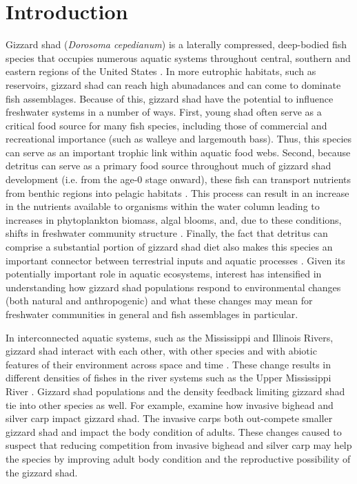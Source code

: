 \documentclass[preprint,review,12pt,authoryear]{elsarticle}
\begin{document}
\section{Introduction}
Gizzard shad (\emph{Dorosoma cepedianum}) is a laterally compressed, deep-bodied fish species that occupies numerous aquatic systems throughout central, southern and eastern regions of the United States \citep{pierce1981aspects,vanni2005linking}.  In more eutrophic habitats, such as reservoirs, gizzard shad can reach high abunadances and can come to dominate fish assemblages. Because of this, gizzard shad have the potential to influence freshwater systems in a number of ways. 
First, young shad often serve as a critical food source for many fish species, including those of commercial and recreational importance (such as walleye and largemouth bass)\citep{jester1972life}. Thus, this species can serve as an important trophic link within aquatic food webs.
Second, because detritus can serve as a primary food source throughout much of gizzard shad development (i.e. from the age-0 stage onward), these fish can transport nutrients
from benthic regions into pelagic habitats \citep{mather1995regeneration, schaus2000effects, vanni2005linking}. 
This process can result in an increase in the nutrients available to organisms within the water column leading to increases in phytoplankton biomass, algal blooms, and, due to these conditions, shifts in freshwater community structure \citep{aday2003direct, schaus2000effects}. 
Finally, the fact that detritus can comprise a substantial portion of gizzard shad diet also makes this species an important connector between terrestrial inputs and aquatic processes \citep{schaus2000effects}.
Given its potentially important role in aquatic ecosystems, interest has intensified in understanding how gizzard shad populations respond to environmental changes (both natural and anthropogenic) and what these changes may mean for freshwater communities in general and fish assemblages in particular.

In interconnected aquatic systems, such as the Mississippi and Illinois Rivers, gizzard shad interact with each other, with other species and with abiotic features of their environment across space and time \citep{thorp2006riverine}. 
These change results in different densities of fishes in the river systems such as the Upper Mississippi River \citep{holland1986distribution}.
Gizzard shad populations and the density feedback limiting gizzard shad tie into other species as well.
For example, \citet{love2018does} examine how invasive bighead and silver carp impact gizzard shad.
The invasive carps both out-compete smaller gizzard shad and impact the body condition of adults.
These changes caused \citet{love2018does} to suspect that reducing competition from invasive bighead and silver carp may help the species by improving adult body condition and the reproductive possibility of the gizzard shad.
\end{document}
